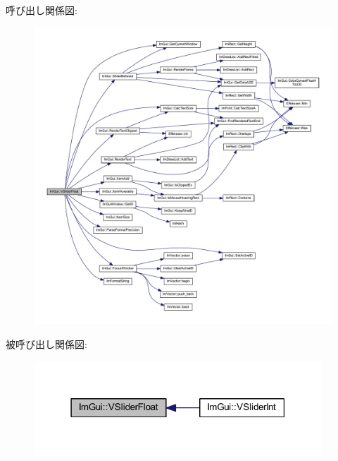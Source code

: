 呼び出し関係図\+:\nopagebreak
\begin{figure}[H]
\begin{center}
\leavevmode
\includegraphics[width=350pt]{namespace_im_gui_ae629791ee70ba60199597cd1866b3735_cgraph}
\end{center}
\end{figure}
被呼び出し関係図\+:\nopagebreak
\begin{figure}[H]
\begin{center}
\leavevmode
\includegraphics[width=307pt]{namespace_im_gui_ae629791ee70ba60199597cd1866b3735_icgraph}
\end{center}
\end{figure}
\mbox{\label{namespace_im_gui_a7a8e53471ef7f8b7ad28abea35a40bf4}} 
